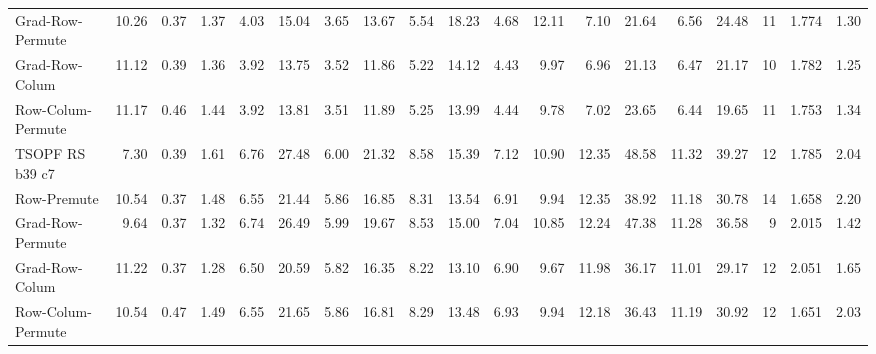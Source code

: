 \begin{table}[hbt]
\begin{tabular}{lrrrrrrrrrrrrrrrrrr}
Grad-Row-Permute     &10.26  &0.37 &  1.37 & 4.03 & 15.04 & 3.65 & 13.67  & 5.54  &18.23  & 4.68  &12.11  &  7.10  &21.64  & 6.56  &24.48  &11  &1.774   &1.30  \\       
Grad-Row-Colum       &11.12  &0.39 &  1.36 & 3.92 & 13.75 & 3.52 & 11.86  & 5.22  &14.12  & 4.43  & 9.97  &  6.96  &21.13  & 6.47  &21.17  &10  &1.782   &1.25  \\       
Row-Colum-Permute    &11.17  &0.46 &  1.44 & 3.92 & 13.81 & 3.51 & 11.89  & 5.25  &13.99  & 4.44  & 9.78  &  7.02  &23.65  & 6.44  &19.65  &11  &1.753   &1.34  \\ \hline
TSOPF RS b39 c7      & 7.30  &0.39 &  1.61 & 6.76 & 27.48 & 6.00 & 21.32  & 8.58  &15.39  & 7.12  &10.90  & 12.35  &48.58  &11.32  &39.27  &12  &1.785   &2.04  \\       
Row-Premute          &10.54  &0.37 &  1.48 & 6.55 & 21.44 & 5.86 & 16.85  & 8.31  &13.54  & 6.91  & 9.94  & 12.35  &38.92  &11.18  &30.78  &14  &1.658   &2.20  \\       
Grad-Row-Permute     & 9.64  &0.37 &  1.32 & 6.74 & 26.49 & 5.99 & 19.67  & 8.53  &15.00  & 7.04  &10.85  & 12.24  &47.38  &11.28  &36.58  & 9  &2.015   &1.42  \\       
Grad-Row-Colum       &11.22  &0.37 &  1.28 & 6.50 & 20.59 & 5.82 & 16.35  & 8.22  &13.10  & 6.90  & 9.67  & 11.98  &36.17  &11.01  &29.17  &12  &2.051   &1.65  \\       
Row-Colum-Permute    &10.54  &0.47 &  1.49 & 6.55 & 21.65 & 5.86 & 16.81  & 8.29  &13.48  & 6.93  & 9.94  & 12.18  &36.43  &11.19  &30.92  &12  &1.651   &2.03  \\ \hline
  \end{tabular}
\end{table}
